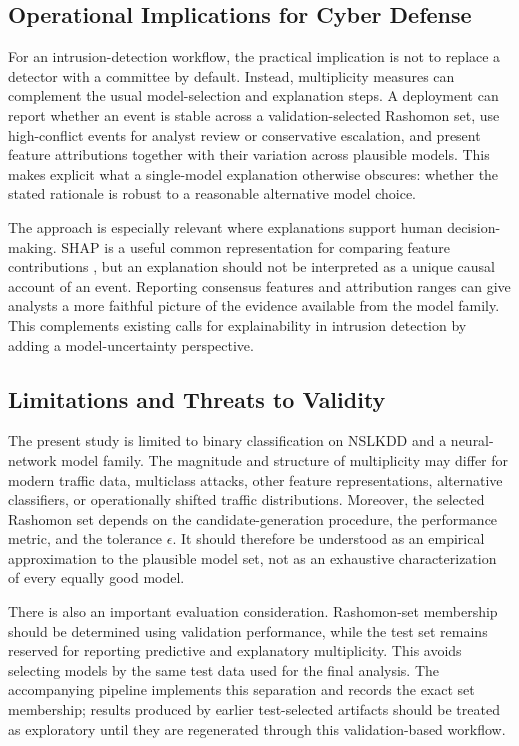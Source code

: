 \subsection{Operational Implications for Cyber Defense}

For an intrusion-detection workflow, the practical implication is not to replace a detector with a committee by default. Instead, multiplicity measures can complement the usual model-selection and explanation steps. A deployment can report whether an event is stable across a validation-selected Rashomon set, use high-conflict events for analyst review or conservative escalation, and present feature attributions together with their variation across plausible models. This makes explicit what a single-model explanation otherwise obscures: whether the stated rationale is robust to a reasonable alternative model choice.

The approach is especially relevant where explanations support human decision-making. \gls{SHAP} is a useful common representation for comparing feature contributions \cite{lundberg2017unified}, but an explanation should not be interpreted as a unique causal account of an event. Reporting consensus features and attribution ranges can give analysts a more faithful picture of the evidence available from the model family. This complements existing calls for explainability in intrusion detection \cite{choras2020machine,szczepanski2020achieving} by adding a model-uncertainty perspective.

\subsection{Limitations and Threats to Validity}

The present study is limited to binary classification on \gls{NSLKDD} and a neural-network model family. The magnitude and structure of multiplicity may differ for modern traffic data, multiclass attacks, other feature representations, alternative classifiers, or operationally shifted traffic distributions. Moreover, the selected Rashomon set depends on the candidate-generation procedure, the performance metric, and the tolerance $\epsilon$. It should therefore be understood as an empirical approximation to the plausible model set, not as an exhaustive characterization of every equally good model.

There is also an important evaluation consideration. Rashomon-set membership should be determined using validation performance, while the test set remains reserved for reporting predictive and explanatory multiplicity. This avoids selecting models by the same test data used for the final analysis. The accompanying pipeline implements this separation and records the exact set membership; results produced by earlier test-selected artifacts should be treated as exploratory until they are regenerated through this validation-based workflow.

